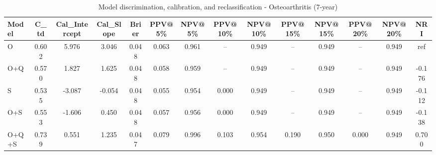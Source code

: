 \begin{table}[htbp]
\centering
\small
\caption{Model discrimination, calibration, and reclassification - Osteoarthritis (7-year)}
\label{tab:perf_osteoarthritis_7y}
\begin{tabular}{lccccccccccccc}
\toprule
Model & C\_td & Cal\_Intercept & Cal\_Slope & Brier & PPV@5\% & NPV@5\% & PPV@10\% & NPV@10\% & PPV@15\% & NPV@15\% & PPV@20\% & NPV@20\% & NRI \\
\midrule
O & 0.602 & 5.976 & 3.046 & 0.048 & 0.063 & 0.961 & -- & 0.949 & -- & 0.949 & -- & 0.949 & ref \\
O+Q & 0.570 & 1.827 & 1.625 & 0.048 & 0.058 & 0.959 & -- & 0.949 & -- & 0.949 & -- & 0.949 & -0.176 \\
S & 0.535 & -3.087 & -0.054 & 0.048 & 0.055 & 0.954 & 0.000 & 0.949 & -- & 0.949 & -- & 0.949 & -0.112 \\
O+S & 0.553 & -1.606 & 0.450 & 0.048 & 0.057 & 0.956 & 0.000 & 0.949 & -- & 0.949 & -- & 0.949 & -0.138 \\
O+Q+S & 0.739 & 0.551 & 1.235 & 0.047 & 0.079 & 0.996 & 0.103 & 0.954 & 0.190 & 0.950 & 0.000 & 0.949 & 0.700 \\
\bottomrule
\end{tabular}
\end{table}